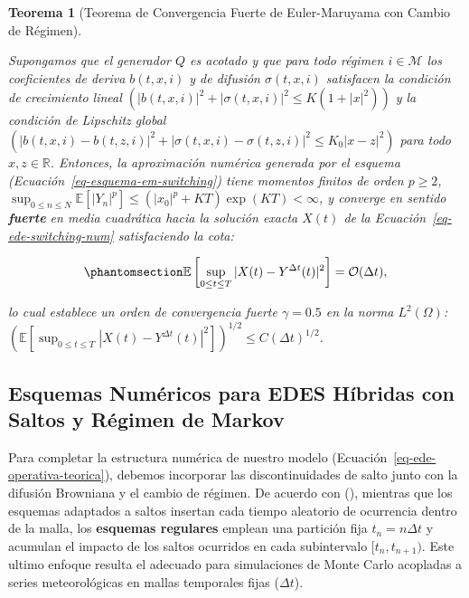 \documentclass[
  spanish,
  letterpaper,
  DIV=11,
  numbers=noendperiod]{scrreprt}
\theoremstyle{plain}
\theoremstyle{plain}
\newtheorem{theorem}{Teorema}[chapter]
\theoremstyle{plain}
\theoremstyle{definition}
\theoremstyle{remark}
\begin{document}
\begin{theorem}[Teorema de Convergencia Fuerte de Euler-Maruyama con
Cambio de
Régimen]\protect\hypertarget{thm-em-switching}{}\label{thm-em-switching}

Supongamos que el generador \(Q\) es acotado y que para todo régimen
\(i \in \mathcal{M}\) los coeficientes de deriva \(b(t, x, i)\) y de
difusión \(\sigma(t, x, i)\) satisfacen la condición de crecimiento
lineal
\(\left( |b(t, x, i)|^2 + |\sigma(t, x, i)|^2 \le K(1 + |x|^2)\right)\)
y la condición de Lipschitz global
\(\left( |b(t, x, i) - b(t, z, i)|^2 + |\sigma(t, x, i) - \sigma(t, z, i)|^2 \le K_0|x - z|^2 \right)\)
para todo \(x, z \in \mathbb{R}\). Entonces, la aproximación numérica
generada por el esquema (Ecuación~\ref{eq-esquema-em-switching}) tiene
momentos finitos de orden \(p \ge 2\),
\(\displaystyle \sup_{0 \le n \le N} \mathbb{E}[|Y_n|^p] \le (|x_0|^p + KT)\exp(KT) < \infty\),
y converge en sentido \textbf{fuerte} en media cuadrática hacia la
solución exacta \(X(t)\) de la Ecuación~\ref{eq-ede-switching-num}
satisfaciendo la cota:

\begin{equation}\phantomsection\label{eq-cota-fuerte-switching}{
\mathbb{E}\left[ \sup_{0 \le t \le T} \vert X(t) - Y^{\Delta t}(t) \vert^2 \right] = \mathcal{O}(\Delta t),
}\end{equation}

lo cual establece un orden de convergencia fuerte \(\gamma = 0.5\) en la
norma \(\displaystyle L^2(\Omega)\):
\(\displaystyle \left(\mathbb{E}[\sup_{0 \le t \le T} |X(t) - Y^{\Delta t}(t)|^2]\right)^{1/2} \le C(\Delta t)^{1/2}\).

\end{theorem}

\subsection{Esquemas Numéricos para EDES Híbridas con Saltos y Régimen
de Markov}\label{sec-numerico-saltos}

Para completar la estructura numérica de nuestro modelo
(Ecuación~\ref{eq-ede-operativa-teorica}), debemos incorporar las
discontinuidades de salto junto con la difusión Browniana y el cambio de
régimen. De acuerdo con (), mientras que los esquemas adaptados a saltos
insertan cada tiempo aleatorio de ocurrencia dentro de la malla, los
\textbf{esquemas regulares} emplean una partición fija
\(t_n = n\Delta t\) y acumulan el impacto de los saltos ocurridos en
cada subintervalo \([t_n, t_{n+1})\). Este ultimo enfoque resulta el
adecuado para simulaciones de Monte Carlo acopladas a series
meteorológicas en mallas temporales fijas (\(\Delta t\)).
\end{document}
